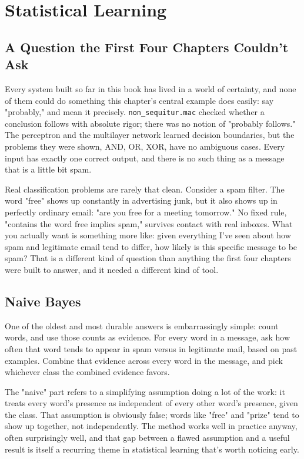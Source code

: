 \chapter{Statistical Learning}

\section*{A Question the First Four Chapters Couldn't Ask}

Every system built so far in this book has lived in a world of certainty, and none of them could do something this chapter's central example does easily: say "probably," and mean it precisely. \texttt{non\_sequitur.mac} checked whether a conclusion follows with absolute rigor; there was no notion of "probably follows." The perceptron and the multilayer network learned decision boundaries, but the problems they were shown, AND, OR, XOR, have no ambiguous cases. Every input has exactly one correct output, and there is no such thing as a message that is a little bit spam.

Real classification problems are rarely that clean. Consider a spam filter. The word "free" shows up constantly in advertising junk, but it also shows up in perfectly ordinary email: "are you free for a meeting tomorrow." No fixed rule, "contains the word free implies spam," survives contact with real inboxes. What you actually want is something more like: given everything I've seen about how spam and legitimate email tend to differ, how likely is this specific message to be spam? That is a different kind of question than anything the first four chapters were built to answer, and it needed a different kind of tool.

\section*{Naive Bayes}

One of the oldest and most durable answers is embarrassingly simple: count words, and use those counts as evidence. For every word in a message, ask how often that word tends to appear in spam versus in legitimate mail, based on past examples. Combine that evidence across every word in the message, and pick whichever class the combined evidence favors.

The "naive" part refers to a simplifying assumption doing a lot of the work: it treats every word's presence as independent of every other word's presence, given the class. That assumption is obviously false; words like "free" and "prize" tend to show up together, not independently. The method works well in practice anyway, often surprisingly well, and that gap between a flawed assumption and a useful result is itself a recurring theme in statistical learning that's worth noticing early.

